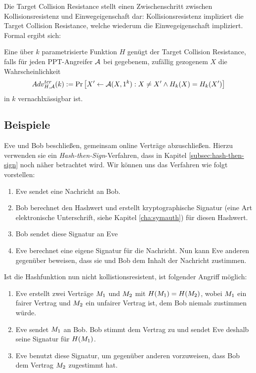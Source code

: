 Die Target Collision Resistance stellt einen Zwischenschritt zwischen Kollisionsresistenz und Einwegeigenschaft dar: Kollisionsresistenz impliziert die
Target Collision Resistance, welche wiederum die Einwegeigenschaft impliziert. Formal ergibt sich:\\

\begin{definition}
Eine über $k$ parametrisierte Funktion $H$ genügt der Target Collision Resistance, falls für jeden PPT-Angreifer $\mathcal{A}$ bei gegebenem, zufällig gezogenem $X$ die Wahrscheinlichkeit
\begin{equation*}
Adv^{tcr}_{H,\mathcal{A}}(k):= \Pr \left[ X' \leftarrow \mathcal{A}(X, 1^k) : X \neq X' \land H_k(X) = H_k(X')\right]
\end{equation*}
in $k$ vernachlxässigbar ist.
\end{definition}
\subsection{Beispiele}

\begin{beispiel}
Eve und Bob beschließen, gemeinsam online Verträge abzuschließen. Hierzu
verwenden sie ein \textit{Hash-then-Sign}-Verfahren, dass in Kapitel
\ref{subsec:hash-then-sign} noch näher betrachtet wird. Wir können uns
das Verfahren wie 
folgt vorstellen: 
\begin{enumerate}
\item Eve sendet eine Nachricht an Bob.
\item Bob berechnet den Hashwert und erstellt kryptographische
  Signatur (eine Art \glqq elektronische Unterschrift\grqq, siehe
  Kapitel \ref{cha:symauth}) für diesen Hashwert.
\item Bob sendet diese Signatur an Eve
\item Eve berechnet eine eigene Signatur für die Nachricht. Nun kann Eve
  anderen gegenüber beweisen, dass sie und Bob dem Inhalt der Nachricht
  zustimmen. 
\end{enumerate}
Ist die Hashfunktion nun nicht kollistionsresistent, ist folgender
Angriff möglich:
\begin{enumerate}
\item Eve erstellt zwei Verträge $M_1$ und $M_2$ mit
  $H(M_1) = H(M_2)$, wobei
  $M_1$ ein fairer Vertrag und $M_2$ ein unfairer Vertrag
  ist, dem Bob niemals zustimmen würde.
\item Eve sendet $M_1$ an Bob. Bob stimmt dem Vertrag zu und
  sendet Eve deshalb seine Signatur für $H(M_1)$.
\item Eve benutzt diese Signatur, um gegenüber anderen vorzuweisen, dass
  Bob dem Vertrag $M_2$ zugestimmt hat.
\end{enumerate}
\end{beispiel}

